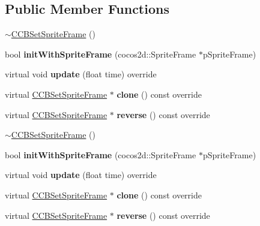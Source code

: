 \subsection*{Public Member Functions}
\begin{DoxyCompactItemize}
\item 
\hyperlink{classcocosbuilder_1_1CCBSetSpriteFrame_adefee94b6e6667d708b9309e17166e26}{$\sim$\+C\+C\+B\+Set\+Sprite\+Frame} ()
\item 
\mbox{\label{classcocosbuilder_1_1CCBSetSpriteFrame_acb32fcf36da7074c0483cd769f7f4ca6}} 
bool {\bfseries init\+With\+Sprite\+Frame} (cocos2d\+::\+Sprite\+Frame $\ast$p\+Sprite\+Frame)
\item 
\mbox{\label{classcocosbuilder_1_1CCBSetSpriteFrame_aa42927237d4ef8c8d21184aeabef70d7}} 
virtual void {\bfseries update} (float time) override
\item 
\mbox{\label{classcocosbuilder_1_1CCBSetSpriteFrame_a202433b98d6a670984547fec5cb88e44}} 
virtual \hyperlink{classcocosbuilder_1_1CCBSetSpriteFrame}{C\+C\+B\+Set\+Sprite\+Frame} $\ast$ {\bfseries clone} () const override
\item 
\mbox{\label{classcocosbuilder_1_1CCBSetSpriteFrame_a81bb72dfa9966b4a750ae0914a425f2f}} 
virtual \hyperlink{classcocosbuilder_1_1CCBSetSpriteFrame}{C\+C\+B\+Set\+Sprite\+Frame} $\ast$ {\bfseries reverse} () const override
\item 
\hyperlink{classcocosbuilder_1_1CCBSetSpriteFrame_adefee94b6e6667d708b9309e17166e26}{$\sim$\+C\+C\+B\+Set\+Sprite\+Frame} ()
\item 
\mbox{\label{classcocosbuilder_1_1CCBSetSpriteFrame_acb32fcf36da7074c0483cd769f7f4ca6}} 
bool {\bfseries init\+With\+Sprite\+Frame} (cocos2d\+::\+Sprite\+Frame $\ast$p\+Sprite\+Frame)
\item 
\mbox{\label{classcocosbuilder_1_1CCBSetSpriteFrame_ac288af0d46eed239a1e9d431d794f905}} 
virtual void {\bfseries update} (float time) override
\item 
\mbox{\label{classcocosbuilder_1_1CCBSetSpriteFrame_a096397d22a00708d4df30c0769f4699a}} 
virtual \hyperlink{classcocosbuilder_1_1CCBSetSpriteFrame}{C\+C\+B\+Set\+Sprite\+Frame} $\ast$ {\bfseries clone} () const override
\item 
\mbox{\label{classcocosbuilder_1_1CCBSetSpriteFrame_a5d92a21c2da7a34e290f50298ca52e51}} 
virtual \hyperlink{classcocosbuilder_1_1CCBSetSpriteFrame}{C\+C\+B\+Set\+Sprite\+Frame} $\ast$ {\bfseries reverse} () const override
\end{DoxyCompactItemize}
